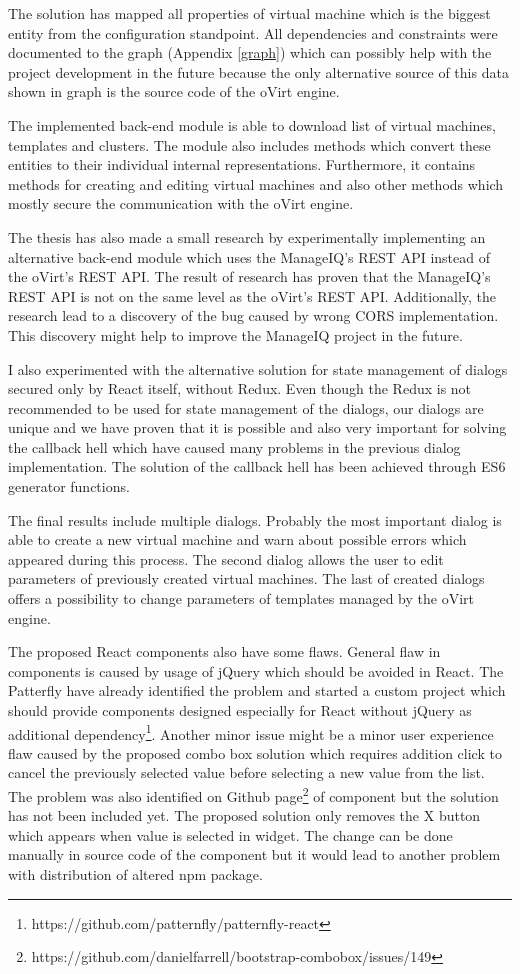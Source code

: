 The solution has mapped all properties of virtual machine which is the biggest entity from the configuration standpoint. All dependencies and constraints were documented to the graph (Appendix \ref{graph}) which can possibly help with the project development in the future because the only alternative source of this data shown in graph is the source code of the oVirt engine.

The implemented back-end module is able to download list of virtual machines, templates and clusters. The module also includes methods which convert these entities to their individual internal representations. Furthermore, it contains methods for creating and editing virtual machines and also other methods which mostly secure the communication with the oVirt engine.

The thesis has also made a small research by experimentally implementing an alternative back-end module which uses the ManageIQ's REST API instead of the oVirt's REST API. The result of research has proven that the ManageIQ's REST API is not on the same level as the oVirt's REST API. Additionally, the research lead to a discovery of the bug caused by wrong CORS implementation. This discovery might help to improve the ManageIQ project in the future. 

I also experimented with the alternative solution for state management of dialogs secured only by React itself, without Redux. Even though the Redux is not recommended to be used for state management of the dialogs, our dialogs are unique and we have proven that it is possible and also very important for solving the callback hell which have caused many problems in the previous dialog implementation. The solution of the callback hell has been achieved through ES6 generator functions.

The final results include multiple dialogs. Probably the most important dialog is able to create a new virtual machine and warn about possible errors which appeared during this process. The second dialog allows the user to edit parameters of previously created virtual machines. The last of created dialogs offers a possibility to change parameters of templates managed by the oVirt engine.

The proposed React components also have some flaws. General flaw in components is caused by usage of jQuery which should be avoided in React. The Patterfly have already identified the problem and started a custom project which should provide components designed especially for React without jQuery as additional dependency\footnote{https://github.com/patternfly/patternfly-react}. Another minor issue might be a minor user experience flaw caused by the proposed combo box solution which requires addition click to cancel the previously selected value before selecting a new value from the list. The problem was also identified on Github page\footnote{https://github.com/danielfarrell/bootstrap-combobox/issues/149 } of component but the solution has not been included yet. The proposed solution only removes the X button which appears when value is selected in widget. The change can be done manually in source code of the component but it would lead to another problem with distribution of altered npm package.

